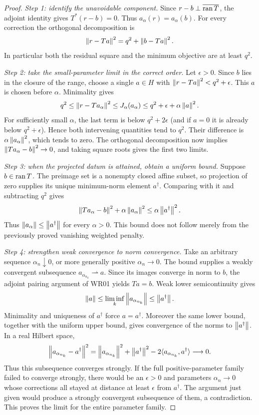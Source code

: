 \begin{proof}
\emph{Step 1: identify the unavoidable component.} Since $r-b\perp\overline{\operatorname{ran} T}$, the adjoint identity gives $T^*(r-b)=0$. Thus $a_\alpha(r)=a_\alpha(b)$. For every correction the orthogonal decomposition is
\[
 \left\lVert r-Ta\right\rVert^2=q^2+\left\lVert b-Ta\right\rVert^2.
\]
In particular both the residual square and the minimum objective are at least $q^2$.

\emph{Step 2: take the small-parameter limit in the correct order.} Let $\epsilon>0$. Since $b$ lies in the closure of the range, choose a single $a\in H$ with $\left\lVert r-Ta\right\rVert^2<q^2+\epsilon$. This $a$ is chosen before $\alpha$. Minimality gives
\[
 q^2\le\left\lVert r-Ta_\alpha\right\rVert^2
 \le J_\alpha(a_\alpha)
 \le q^2+\epsilon+\alpha\left\lVert a\right\rVert^2.
\]
For sufficiently small $\alpha$, the last term is below $q^2+2\epsilon$ (and if $a=0$ it is already below $q^2+\epsilon$). Hence both intervening quantities tend to $q^2$. Their difference is $\alpha\left\lVert a_\alpha\right\rVert^2$, which tends to zero. The orthogonal decomposition now implies $\left\lVert Ta_\alpha-b\right\rVert^2\to0$, and taking square roots gives the first two limits.

\emph{Step 3: when the projected datum is attained, obtain a uniform bound.} Suppose $b\in\operatorname{ran} T$. The preimage set is a nonempty closed affine subset, so projection of zero supplies its unique minimum-norm element $a^\dagger$. Comparing with it and subtracting $q^2$ gives
\[
 \left\lVert Ta_\alpha-b\right\rVert^2+\alpha\left\lVert a_\alpha\right\rVert^2
 \le\alpha\left\lVert a^\dagger\right\rVert^2.
\]
Thus $\left\lVert a_\alpha\right\rVert\le\left\lVert a^\dagger\right\rVert$ for every $\alpha>0$. This bound does not follow merely from the previously proved vanishing weighted penalty.

\emph{Step 4: strengthen weak convergence to norm convergence.} Take an arbitrary sequence $\alpha_n\downarrow0$, or more generally positive $\alpha_n\to0$. The bound supplies a weakly convergent subsequence $a_{\alpha_{n_k}}\rightharpoonup a$. Since its images converge in norm to $b$, the adjoint pairing argument of WR01 yields $Ta=b$. Weak lower semicontinuity gives
\[
 \left\lVert a\right\rVert\le\liminf_k\left\lVert a_{\alpha_{n_k}}\right\rVert
 \le\left\lVert a^\dagger\right\rVert.
\]
Minimality and uniqueness of $a^\dagger$ force $a=a^\dagger$. Moreover the same lower bound, together with the uniform upper bound, gives convergence of the norms to $\left\lVert a^\dagger\right\rVert$. In a real Hilbert space,
\[
 \left\lVert a_{\alpha_{n_k}}-a^\dagger\right\rVert^2
 =\left\lVert a_{\alpha_{n_k}}\right\rVert^2+\left\lVert a^\dagger\right\rVert^2
       -2\langle a_{\alpha_{n_k}},a^\dagger\rangle\longrightarrow0.
\]
Thus this subsequence converges strongly. If the full positive-parameter family failed to converge strongly, there would be an $\epsilon>0$ and parameters $\alpha_n\to0$ whose corrections all stayed at distance at least $\epsilon$ from $a^\dagger$. The argument just given would produce a strongly convergent subsequence of them, a contradiction. This proves the limit for the entire parameter family.


\end{proof}

